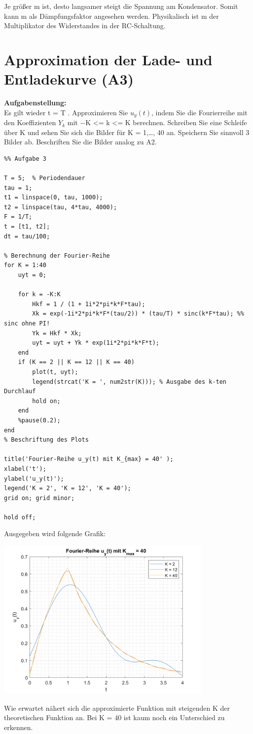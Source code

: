 Je größer m ist, desto langsamer steigt die Spannung am Kondensator. Somit kann m als Dämpfungsfaktor angesehen werden. Physikalisch ist m der Multiplikator des Widerstandes in der RC-Schaltung.

\newpage

\section{Approximation der Lade- und Entladekurve (A3)}

\textbf{Aufgabenstellung:\\}
Es gilt wieder t = T . Approximieren Sie $u_y(t)$, indem Sie die Fourierreihe mit den Koeffizienten $Y_k$ mit −K <= k <= K berechnen. Schreiben Sie eine Schleife über K und sehen Sie sich die Bilder für K = 1,…, 40 an. Speichern Sie sinnvoll 3 Bilder ab. Beschriften Sie die Bilder analog zu A2.

\vspace{0.7cm}

\begin{lstlisting}
%% Aufgabe 3

T = 5;  % Periodendauer
tau = 1;
t1 = linspace(0, tau, 1000);
t2 = linspace(tau, 4*tau, 4000);
F = 1/T;
t = [t1, t2];
dt = tau/100;

% Berechnung der Fourier-Reihe
for K = 1:40
	uyt = 0;
	
	for k = -K:K
		Hkf = 1 / (1 + 1i*2*pi*k*F*tau);
		Xk = exp(-1i*2*pi*k*F*(tau/2)) * (tau/T) * sinc(k*F*tau); %% sinc ohne PI!
		Yk = Hkf * Xk;
		uyt = uyt + Yk * exp(1i*2*pi*k*F*t);
	end
	if (K == 2 || K == 12 || K == 40)
		plot(t, uyt);
		legend(strcat('K = ', num2str(K))); % Ausgabe des k-ten Durchlauf
		hold on;
	end
	%pause(0.2);
end
% Beschriftung des Plots
	
title('Fourier-Reihe u_y(t) mit K_{max} = 40' );
xlabel('t');
ylabel('u_y(t)');
legend('K = 2', 'K = 12', 'K = 40');
grid on; grid minor;
	
hold off;
\end{lstlisting}

\newpage

Ausgegeben wird folgende Grafik:

\begin{center}
	\includegraphics[width=300pt]{img/aufgabe3.png}
\end{center}

Wie erwartet nähert sich die approximierte Funktion mit steigenden K der theoretischen Funktion an. Bei K = 40 ist kaum noch ein Unterschied zu erkennen.
